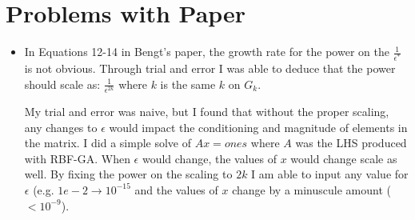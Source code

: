 \documentclass[11pt]{report}
\begin{document}
\section{Problems with Paper}
\begin{itemize}


\item In Equations 12-14 in Bengt's paper, the growth rate for the power on the $\frac{1}{\epsilon^{*}}$ is not obvious. Through trial and error I was able to deduce that the power should scale as: $\frac{1}{\epsilon^{2k}}$ where $k$ is the same $k$ on $G_k$. 

My trial and error was naive, but I found that without the proper scaling, any changes to $\epsilon$ would impact the conditioning and magnitude of elements in the matrix. I did a simple solve of $A x = ones$ where $A$ was the LHS produced with RBF-GA. When $\epsilon$ would change, the values of $x$ would change scale as well. By fixing the power on the scaling to $2k$ I am able to input any value for $\epsilon$ (e.g. $1e-2 \rightarrow 10^{-15}$ and the values of $x$ change by a minuscule amount ($< 10^{-9}$).


\end{itemize}
\end{document}
